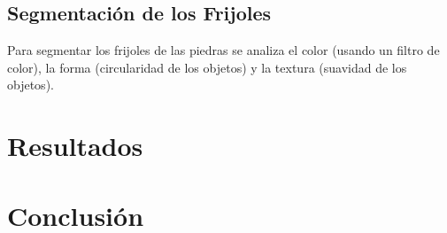 \documentclass[conference]{IEEEtran}
\begin{document}
    \subsection{Segmentación de los Frijoles}
    Para segmentar los frijoles de las piedras se analiza el color (usando un filtro de color), la forma (circularidad de los objetos) y la textura (suavidad de los objetos).
    


\section{Resultados}
    

\section{Conclusión}
    

\nocite{*}
\printbibliography
\end{document}
